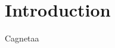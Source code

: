 \documentclass[]{interact}
\theoremstyle{plain}%
\theoremstyle{definition}
\theoremstyle{remark}
\theoremstyle{definition}
\begin{document}
\section{Introduction}
Cagnetaa%
%
%
%
\end{document}
